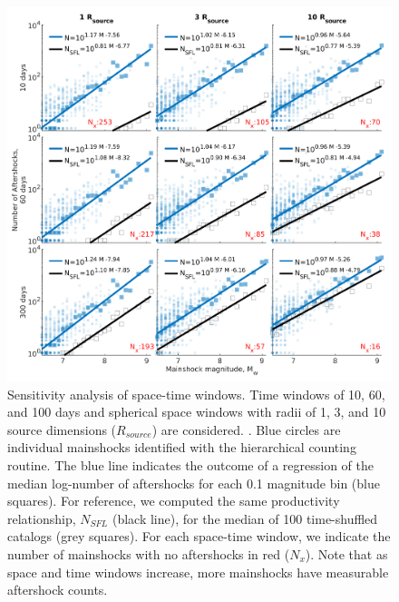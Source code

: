 \documentclass[draft, jgrga]{agujournal2018}
\begin{document}
\begin{figure}
    \centering
    \includegraphics[width = \textwidth]{figures/sensitivity.png}
    \caption{Sensitivity analysis of space-time windows. Time windows of 10, 60, and 100 days and spherical space windows with radii of 1, 3, and 10 source dimensions ($R_{source}$) are considered. . Blue circles are individual mainshocks identified with the hierarchical counting routine. The blue line indicates the outcome of a regression of the median log-number of aftershocks for each 0.1 magnitude bin (blue squares). For reference, we computed the same productivity relationship, $N_{SFL}$ (black line), for the median of 100 time-shuffled catalogs (grey squares). For each space-time window, we indicate the number of mainshocks with no aftershocks in red ($N_x$). Note that as space and time windows increase, more mainshocks have measurable aftershock counts.  
}
    \label{fig:sensitivity}
\end{figure} 
\end{document}
